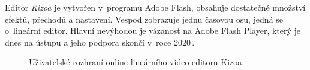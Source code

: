 Editor \textit{Kizoa} je vytvořen v~programu Adobe Flash, obsahuje dostatečné množství efektů, přechodů a nastavení. Vespod zobrazuje jednu časovou osu, jedná se o~lineární editor. Hlavní nevýhodou je vázanost na Adobe Flash Player, který je dnes na ústupu a jeho podpora skončí v~roce 2020\,\cite{FlashPlayer}.
\begin{figure}[ht]
	\centering
	\caption{Uživatelské rozhraní online lineárního video editoru Kizoa. }\label{img:kizoa}
\end{figure}

